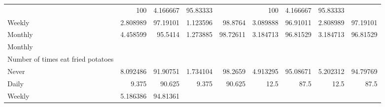 \documentclass{article}
\begin{document}
\begin{tabular}{lllllllll}
  \multicolumn{1}{|r}{} &
  \multicolumn{1}{r}{100} &
  \multicolumn{1}{r}{4.166667} &
  \multicolumn{1}{r}{95.83333} &
  \multicolumn{1}{r}{} &
  \multicolumn{1}{r}{100} &
  \multicolumn{1}{r}{4.166667} &
  \multicolumn{1}{r}{95.83333} \\
\multicolumn{1}{l}{\hspace{7em}Weekly} &
  \multicolumn{1}{|r}{2.808989} &
  \multicolumn{1}{r}{97.19101} &
  \multicolumn{1}{r}{1.123596} &
  \multicolumn{1}{r}{98.8764} &
  \multicolumn{1}{r}{3.089888} &
  \multicolumn{1}{r}{96.91011} &
  \multicolumn{1}{r}{2.808989} &
  \multicolumn{1}{r}{97.19101} \\
\multicolumn{1}{l}{\hspace{7em}Monthly} &
  \multicolumn{1}{|r}{4.458599} &
  \multicolumn{1}{r}{95.5414} &
  \multicolumn{1}{r}{1.273885} &
  \multicolumn{1}{r}{98.72611} &
  \multicolumn{1}{r}{3.184713} &
  \multicolumn{1}{r}{96.81529} &
  \multicolumn{1}{r}{3.184713} &
  \multicolumn{1}{r}{96.81529} \\
\multicolumn{1}{l}{\hspace{5em}Monthly} &
  \multicolumn{1}{|r}{} &
  \multicolumn{1}{r}{} &
  \multicolumn{1}{r}{} &
  \multicolumn{1}{r}{} &
  \multicolumn{1}{r}{} &
  \multicolumn{1}{r}{} &
  \multicolumn{1}{r}{} &
  \multicolumn{1}{r}{} \\
\multicolumn{1}{l}{\hspace{6em}Number of times eat fried potatoes} &
  \multicolumn{1}{|r}{} &
  \multicolumn{1}{r}{} &
  \multicolumn{1}{r}{} &
  \multicolumn{1}{r}{} &
  \multicolumn{1}{r}{} &
  \multicolumn{1}{r}{} &
  \multicolumn{1}{r}{} &
  \multicolumn{1}{r}{} \\
\multicolumn{1}{l}{\hspace{7em}Never} &
  \multicolumn{1}{|r}{8.092486} &
  \multicolumn{1}{r}{91.90751} &
  \multicolumn{1}{r}{1.734104} &
  \multicolumn{1}{r}{98.2659} &
  \multicolumn{1}{r}{4.913295} &
  \multicolumn{1}{r}{95.08671} &
  \multicolumn{1}{r}{5.202312} &
  \multicolumn{1}{r}{94.79769} \\
\multicolumn{1}{l}{\hspace{7em}Daily} &
  \multicolumn{1}{|r}{9.375} &
  \multicolumn{1}{r}{90.625} &
  \multicolumn{1}{r}{9.375} &
  \multicolumn{1}{r}{90.625} &
  \multicolumn{1}{r}{12.5} &
  \multicolumn{1}{r}{87.5} &
  \multicolumn{1}{r}{12.5} &
  \multicolumn{1}{r}{87.5} \\
\multicolumn{1}{l}{\hspace{7em}Weekly} &
  \multicolumn{1}{|r}{5.186386} &
  \multicolumn{1}{r}{94.81361} &

\end{tabular}
\end{document}
